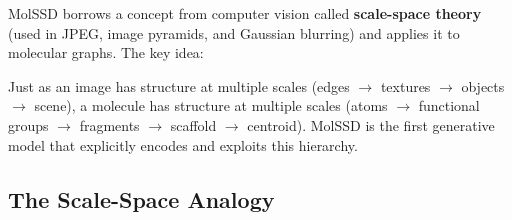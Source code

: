 \documentclass[12pt,a4paper]{article}
\begin{document}
MolSSD borrows a concept from computer vision called \textbf{scale-space theory} (used in JPEG, image pyramids, and Gaussian blurring) and applies it to molecular graphs. The key idea:

\begin{insightbox}
Just as an image has structure at multiple scales (edges $\to$ textures $\to$ objects $\to$ scene), a molecule has structure at multiple scales (atoms $\to$ functional groups $\to$ fragments $\to$ scaffold $\to$ centroid). MolSSD is the first generative model that explicitly encodes and exploits this hierarchy.
\end{insightbox}

\subsection{The Scale-Space Analogy}
\end{document}
